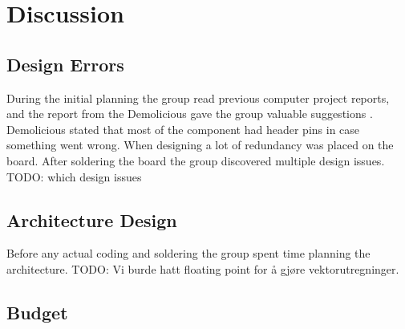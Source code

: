 \chapter{Discussion}

\section{Design Errors}
During the initial planning the group read previous computer project reports,
and the report from the Demolicious gave the group valuable suggestions \cite{demolicious-report}.
Demolicious stated that most of the component had header pins in case something went wrong.
When designing a lot of redundancy was placed on the board.
After soldering the board the group discovered multiple design issues. TODO: which design issues

\section{Architecture Design}
Before any actual coding and soldering the group spent time planning the architecture.
TODO: Vi burde hatt floating point for å gjøre vektorutregninger.

\section{Budget}
